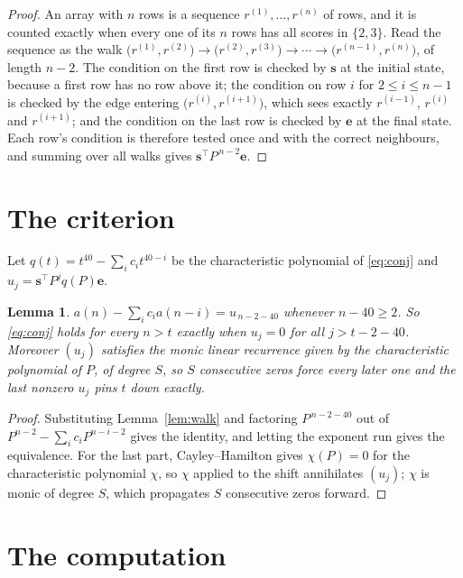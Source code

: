 \documentclass[11pt,a4paper]{article}
\theoremstyle{plain}
\newtheorem{lemma}[theorem]{Lemma}
\theoremstyle{definition}
\begin{document}
\begin{proof}
An array with $n$ rows is a sequence $r^{(1)},\dots,r^{(n)}$ of rows, and it is counted
exactly when every one of its $n$ rows has all scores in $\{2,3\}$. Read the sequence as the
walk $\bigl(r^{(1)},r^{(2)}\bigr)\to\bigl(r^{(2)},r^{(3)}\bigr)\to\cdots\to
\bigl(r^{(n-1)},r^{(n)}\bigr)$, of length $n-2$. The condition on the first row is
checked by $\mathbf{s}$ at the initial state, because a first row has no row above it; the
condition on row $i$ for $2\le i\le n-1$ is checked by the edge entering
$\bigl(r^{(i)},r^{(i+1)}\bigr)$, which sees exactly $r^{(i-1)}$, $r^{(i)}$ and
$r^{(i+1)}$; and the condition on the last row is checked by $\mathbf{e}$ at the final
state. Each row's condition is therefore tested once and with the correct neighbours, and
summing over all walks gives $\mathbf{s}^{\!\top}P^{\,n-2}\mathbf{e}$.
\end{proof}

\section{The criterion}

Let $q(t)=t^{40}-\sum_i c_i t^{40-i}$ be the characteristic polynomial of
\eqref{eq:conj} and $u_j=\mathbf{s}^{\!\top}P^{j}q(P)\mathbf{e}$.

\begin{lemma}\label{lem:crit}
$a(n)-\sum_i c_i a(n-i)=u_{\,n-2-40}$ whenever $n-40\ge2$. So \eqref{eq:conj}
holds for every $n>t$ exactly when $u_j=0$ for all $j>t-2-40$. Moreover $(u_j)$
satisfies the monic linear recurrence given by the characteristic polynomial of $P$, of
degree $S$, so $S$ consecutive zeros force every later one and the last nonzero $u_j$ pins
$t$ down exactly.
\end{lemma}

\begin{proof}
Substituting Lemma~\ref{lem:walk} and factoring $P^{\,n-2-40}$ out of
$P^{n-2}-\sum_i c_i P^{n-i-2}$ gives the identity, and letting the exponent run gives the
equivalence. For the last part, Cayley--Hamilton gives $\chi(P)=0$ for the characteristic
polynomial $\chi$, so $\chi$ applied to the shift annihilates $(u_j)$; $\chi$ is monic of
degree $S$, which propagates $S$ consecutive zeros forward.
\end{proof}

\section{The computation}
\end{document}
